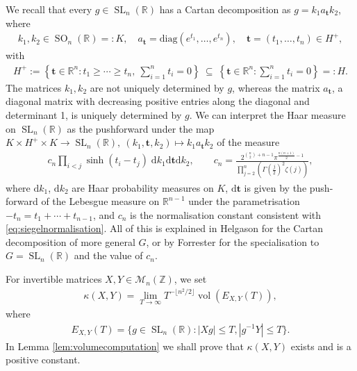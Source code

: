 \documentclass[11pt,reqno]{amsart}
\theoremstyle{definition}
\theoremstyle{remark}
\newcommand{\vol}{\operatorname{vol}}
\newcommand{\SL}{\operatorname{SL}}
\newcommand{\SO}{\operatorname{SO}}
\numberwithin{equation}{section}
\numberwithin{thm}{section}
\numberwithin{table}{section}
\def \R {{\mathbb R}}
\def \Z {{\mathbb Z}}
\begin{document}
 We recall that every $g \in \SL_n(\R)$ has a Cartan decomposition as
    $g = k_1 a_{\mathbf{t}} k_2$, where
    \begin{align}
    \label{eq:cartan_decomp}
         k_1, k_2 \in \SO_n(\R) =:K, \quad a_{\mathbf{t}} = \mathrm{diag}(e^{t_1}, \ldots, e^{t_n}), \quad \mathbf{t} = (t_1,\ldots, t_n) \in H^{+}, 
    \end{align}
    with     \begin{align}\label{eq:defH+}
  H^{+} := 
 \left \{
  \mathbf{t} \in \R^n : t_1 \ge \cdots \ge t_n , \ \sum_{i=1}^n t_i = 0
 \right  \} \ \subseteq \
 \left \{ 
         \mathbf{t} \in \R^n : \sum_{i=1}^n t_i = 0
         \right \} =: H .
     \end{align} 
     The matrices $k_1, k_2$ are not uniquely determined by $g$, whereas the matrix $a_{\mathbf{t}}$, a
  diagonal matrix with decreasing positive entries along the diagonal and determinant 1, is uniquely determined by $g$. We can interpret the  Haar measure on $\SL_n(\R)$ as 
  the pushforward under the map $K \times H^{+} \times K \to \SL_n(\R),  \ (k_1, \mathbf{t}, k_2) \mapsto k_1 a_{\mathbf{t}} k_2$ of the measure 
  \begin{align}\label{eq:cartanvol}
  c_n \prod_{i<j} \sinh(t_i - t_j) \;
      \mathrm{d}k_1
      \mathrm{d} \mathbf{t}
      \mathrm{d}k_2
      , \qquad
      c_n =  
      \frac{
      2^{\binom{n}{2}+n-1} \pi^{\frac{n(n+1)}{2}-1}
      }{ \prod_{j=2}^n
       (\Gamma(\tfrac{j}{2})^{2} \zeta(j))
      },
  \end{align} 
   where $\mathrm{d}k_1$, $\mathrm{d}k_2$ are Haar probability measures on $K$, $\mathrm{d}\mathbf{t}$ is given by the push-forward of the Lebesgue measure on $\R^{n-1}$ under the parametrisation $-t_n = t_1 + \cdots + t_{n-1}$, and $c_n$ is the normalisation constant consistent with \eqref{eq:siegelnormalisation}. 
   All of this is explained in Helgason \cite[Theorem~5.8]{helgasongroupsandgeom} for the Cartan decomposition of more general $G$, 
   or by Forrester
   \cite[Sections~2.1--2.2, especially (2.6), (2.8) and (2.14)]{cartandecomp}
   for the specialisation to $G = \SL_n(\R)$ and the value of $c_n$.





For invertible matrices $X, Y \in \mathcal{M}_{n}(\Z)$, we set
\begin{align}\label{def:kappa}
    \kappa(X,Y) = \lim_{T \to \infty} 
   T^{-\lfloor n^2/2 \rfloor} \vol (E_{X,Y}(T)),
\end{align}
where
\begin{align}\label{eq:defxy}
    E_{X,Y}(T) = 
    \{
    g \in \SL_n(\R) :  | X g | \le T , | g^{-1} Y| \le T
    \}.
\end{align}
In Lemma \ref{lem:volumecomputation} we shall prove that  $\kappa(X,Y)$ exists and is a positive constant.
\end{document}
